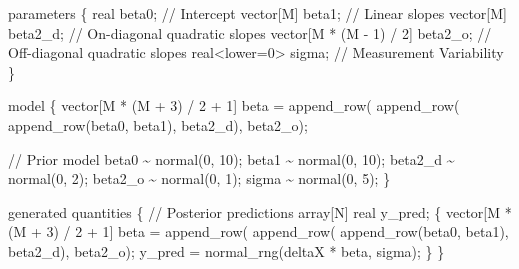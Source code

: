 \documentclass[
  letterpaper,
  DIV=11,
  numbers=noendperiod]{scrartcl}
\newenvironment{Shaded}{\begin{snugshade}}{\end{snugshade}}
\newcommand{\CommentTok}[1]{\textcolor[rgb]{0.37,0.37,0.37}{#1}}
\newcommand{\DataTypeTok}[1]{\textcolor[rgb]{0.68,0.00,0.00}{#1}}
\newcommand{\DecValTok}[1]{\textcolor[rgb]{0.68,0.00,0.00}{#1}}
\newcommand{\KeywordTok}[1]{\textcolor[rgb]{0.00,0.23,0.31}{#1}}
\newcommand{\NormalTok}[1]{\textcolor[rgb]{0.00,0.23,0.31}{#1}}
\begin{document}
\begin{codelisting}
\begin{Shaded}
\begin{Highlighting}[]
\KeywordTok{parameters}\NormalTok{ \{}
  \DataTypeTok{real}\NormalTok{ beta0;                      }\CommentTok{// Intercept}
  \DataTypeTok{vector}\NormalTok{[M] beta1;                 }\CommentTok{// Linear slopes}
  \DataTypeTok{vector}\NormalTok{[M] beta2\_d;               }\CommentTok{// On{-}diagonal quadratic slopes}
  \DataTypeTok{vector}\NormalTok{[M * (M {-} }\DecValTok{1}\NormalTok{) / }\DecValTok{2}\NormalTok{] beta2\_o; }\CommentTok{// Off{-}diagonal quadratic slopes}
  \DataTypeTok{real}\NormalTok{\textless{}}\KeywordTok{lower}\NormalTok{=}\DecValTok{0}\NormalTok{\textgreater{} sigma;             }\CommentTok{// Measurement Variability}
\NormalTok{\}}

\KeywordTok{model}\NormalTok{ \{}
  \DataTypeTok{vector}\NormalTok{[M * (M + }\DecValTok{3}\NormalTok{) / }\DecValTok{2}\NormalTok{ + }\DecValTok{1}\NormalTok{] beta}
\NormalTok{    = append\_row(}
\NormalTok{        append\_row(}
\NormalTok{          append\_row(beta0, beta1), }
\NormalTok{        beta2\_d), }
\NormalTok{      beta2\_o);}
  
  \CommentTok{// Prior model}
\NormalTok{  beta0 \textasciitilde{} normal(}\DecValTok{0}\NormalTok{, }\DecValTok{10}\NormalTok{);}
\NormalTok{  beta1 \textasciitilde{} normal(}\DecValTok{0}\NormalTok{, }\DecValTok{10}\NormalTok{);}
\NormalTok{  beta2\_d \textasciitilde{} normal(}\DecValTok{0}\NormalTok{, }\DecValTok{2}\NormalTok{);}
\NormalTok{  beta2\_o \textasciitilde{} normal(}\DecValTok{0}\NormalTok{, }\DecValTok{1}\NormalTok{);}
\NormalTok{  sigma \textasciitilde{} normal(}\DecValTok{0}\NormalTok{, }\DecValTok{5}\NormalTok{);}
\NormalTok{\}}

\KeywordTok{generated quantities}\NormalTok{ \{}
  \CommentTok{// Posterior predictions}
  \DataTypeTok{array}\NormalTok{[N] }\DataTypeTok{real}\NormalTok{ y\_pred;}
\NormalTok{  \{}
    \DataTypeTok{vector}\NormalTok{[M * (M + }\DecValTok{3}\NormalTok{) / }\DecValTok{2}\NormalTok{ + }\DecValTok{1}\NormalTok{] beta}
\NormalTok{      = append\_row(}
\NormalTok{          append\_row(}
\NormalTok{            append\_row(beta0, beta1), }
\NormalTok{          beta2\_d),}
\NormalTok{        beta2\_o);}
\NormalTok{    y\_pred = normal\_rng(deltaX * beta, sigma);}
\NormalTok{  \}}
\NormalTok{\}}
\end{Highlighting}
\end{Shaded}

\end{codelisting}
\end{document}
